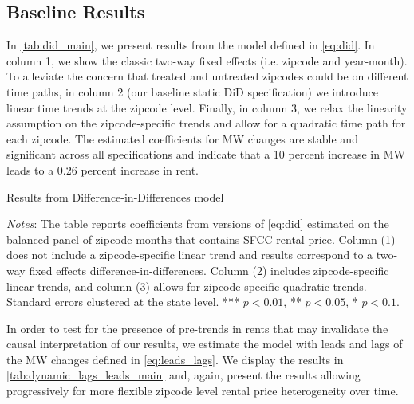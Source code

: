 \subsection{Baseline Results}\label{sec:baseline_results}

In \autoref{tab:did_main}, we present results from the model defined in \autoref{eq:did}. In 
column 1, we show the classic two-way fixed effects (i.e. zipcode and year-month). To alleviate 
the concern that treated and untreated zipcodes could be on different time paths, in column 2 
(our baseline static DiD specification) we introduce linear time trends at the zipcode level. 
Finally, in column 3, we relax the linearity assumption on the zipcode-specific trends and allow 
for a quadratic time path for each zipcode. The estimated coefficients for MW changes are stable 
and significant across all specifications and indicate that a 10 percent increase in MW leads to 
a 0.26 percent increase in rent.

\begin{table}[h!]
    \caption{Results from Difference-in-Differences model}
    \label{tab:did_main}
    \centering
    
    \begin{minipage}{0.95\textwidth} \footnotesize
		\vspace{3mm} 
		\textit{Notes}: The table reports coefficients from versions of \autoref{eq:did} estimated 
		on the balanced panel of zipcode-months that contains SFCC rental price. Column (1) does not 
		include a zipcode-specific linear trend and results correspond to a two-way fixed effects 
		difference-in-differences. Column (2) includes zipcode-specific linear trends, and column (3) 
		allows for zipcode specific quadratic trends. Standard errors clustered at the state level. 
		*** $p < 0.01$, ** $p < 0.05$, * $p < 0.1$.
	\end{minipage}
\end{table}

In order to test for the presence of pre-trends in rents that may invalidate the causal 
interpretation of our results, we estimate the model with leads and lags of the MW changes defined 
in \autoref{eq:leads_lags}. We display the results in \autoref{tab:dynamic_lags_leads_main} and, 
again, present the results allowing progressively for more flexible zipcode level rental price 
heterogeneity over time.

